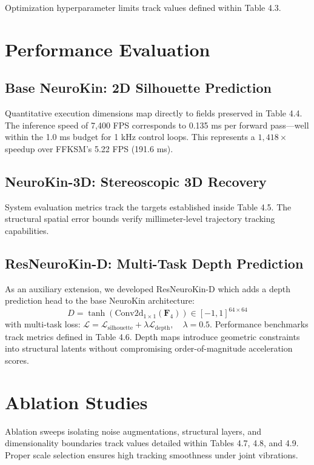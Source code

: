 \documentclass[12pt,a4paper,oneside]{report}
\begin{document}
Optimization hyperparameter limits track values defined within Table 4.3.

\section{Performance Evaluation}

\subsection{Base NeuroKin: 2D Silhouette Prediction}

Quantitative execution dimensions map directly to fields preserved in Table 4.4. The inference speed of 7,400 FPS corresponds to 0.135 ms per forward pass---well within the 1.0 ms budget for 1 kHz control loops. This represents a $1,418\times$ speedup over FFKSM's 5.22 FPS (191.6 ms).

\subsection{NeuroKin-3D: Stereoscopic 3D Recovery}

System evaluation metrics track the targets established inside Table 4.5. The structural spatial error bounds verify millimeter-level trajectory tracking capabilities.

\subsection{ResNeuroKin-D: Multi-Task Depth Prediction}

As an auxiliary extension, we developed ResNeuroKin-D which adds a depth prediction head to the base NeuroKin architecture:
\begin{equation}
\hat{D} = \tanh(\text{Conv2d}_{1\times1}(\mathbf{F}_4)) \in [-1, 1]^{64 \times 64}
\end{equation}
with multi-task loss: $\mathcal{L} = \mathcal{L}_{\text{silhouette}} + \lambda \mathcal{L}_{\text{depth}}, \quad \lambda = 0.5$. Performance benchmarks track metrics defined in Table 4.6. Depth maps introduce geometric constraints into structural latents without compromising order-of-magnitude acceleration scores.

\section{Ablation Studies}

Ablation sweeps isolating noise augmentations, structural layers, and dimensionality boundaries track values detailed within Tables 4.7, 4.8, and 4.9. Proper scale selection ensures high tracking smoothness under joint vibrations.
\end{document}
